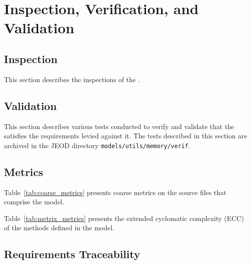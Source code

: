 %
%

\chapter{Inspection, Verification, and Validation}
\label{ch:ivv}

\section{Inspection}\label{sec:inspect}
This section describes the inspections of the \ModelDesc.



\newpage
\section{Validation}
This section describes various tests conducted to verify and validate
that the \ModelDesc satisfies the requirements levied against it.
The tests described in this section
are archived in the JEOD directory \verb+models/utils/memory/verif+.




\newpage
\section{Metrics}

Table~\ref{tab:coarse_metrics} presents coarse metrics on the source
files that comprise the model.


Table~\ref{tab:metrix_metrics} presents the extended cyclomatic complexity (ECC)
of the methods defined in the model.



\newpage
\section{Requirements Traceability}

